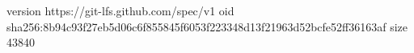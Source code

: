 version https://git-lfs.github.com/spec/v1
oid sha256:8b94c93f27eb5d06c6f855845f6053f223348d13f21963d52bcfe52ff36163af
size 43840
